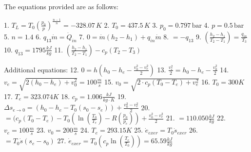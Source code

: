The equations provided are as follows:

1. \( T_L = T_0 \left( \frac{p_0}{p} \right)^{\frac{n-1}{n}} = -328.07 \, K \)
2. \( T_0 = 437.5 \, K \)
3. \( p_0 = 0.797 \, \text{bar} \)
4. \( p = 0.5 \, \text{bar} \)
5. \( n = 1.4 \)
6. \( q_{13} \dot{m} = \dot{Q}_{in} \)
7. \( 0 = \dot{m} (h_2 - h_1) + q_{in} \dot{m} \)
8. \( = -q_{13} \)
9. \( \left( \frac{h_2 - h_1}{T_2 - T_1} \right) = \frac{q_{in}}{T_3} \)
10. \( q_{13} = 1795 \frac{kJ}{kg} \)
11. \( \left( \frac{h_2 - h_1}{T_2 - T_1} \right) - c_p (T_2 - T_3) \)

Additional equations:
12. \( 0 = h \left( h_0 - h_e - \frac{v_0^2 - v_e^2}{2} \right) \)
13. \( \frac{v_e^2}{2} = h_0 - h_e - \frac{v_0^2}{2} \)
14. \( v_e = \sqrt{2 \left( h_0 - h_e \right) + v_0^2} = 100 \frac{m}{s} \)
15. \( v_0 = \sqrt{2 \cdot c_p (T_0 - T_e) + v_e^2} \)
16. \( T_0 = 300 K \)
17. \( T_e = 323.074 K \)
18. \( c_p = 1.006 \frac{kJ}{kg \cdot K} \)
19. \( \Delta s_{e \rightarrow 0} = (h_0 - h_e - T_0 (s_0 - s_e)) + \frac{v_0^2 - v_e^2}{2} \)
20. \( = (c_p (T_0 - T_e) - T_0 (\ln \left( \frac{T_0}{T_e} \right) - R \left( \frac{p_0}{p_e} \right)) + \frac{v_0^2 - v_e^2}{2} \)
21. \( = 110.050 \frac{kJ}{kg} \)
22. \( v_e = 100 \frac{m}{s} \)
23. \( v_0 = 200 \frac{m}{s} \)
24. \( T_e = 293.15 K \)
25. \( \dot{e}_{exer} = T_0 \dot{s}_{exer} \)
26. \( = T_0 \dot{s} (s_e - s_0) \)
27. \( \dot{e}_{exer} = T_0 \left( c_p \ln \left( \frac{T_e}{T_0} \right) \right) = 65.59 \frac{kJ}{kg} \)